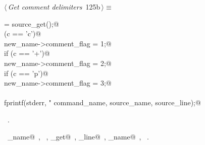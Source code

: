 \documentclass[a4paper]{report}
\begin{document}
\begin{flushleft} \small
\begin{minipage}{\linewidth}\label{scrap265}\raggedright\small
{} $\langle\,${\it Get comment delimiters}\nobreak\ {\footnotesize {125b}}$\,\rangle\equiv$
\vspace{-1ex}
\begin{list}{}{} \item
\mbox{}\verb@c = source_get();@\\
\mbox{}\verb@if (c == 'c')@\\
\mbox{}\verb@   new_name->comment_flag = 1;@\\
\mbox{}\verb@else if (c == '+')@\\
\mbox{}\verb@   new_name->comment_flag = 2;@\\
\mbox{}\verb@else if (c == 'p')@\\
\mbox{}\verb@   new_name->comment_flag = 3;@\\
\mbox{}\verb@else@\\
\mbox{}\verb@   fprintf(stderr, "%s: Unrecognised comment flag (%s, %d)\n",@\\
\mbox{}\verb@           command_name, source_name, source_line);@\\
\mbox{}\verb@@{\NWsep}
\end{list}
\vspace{-1.5ex}
\footnotesize
\begin{list}{}{\setlength{\itemsep}{-\parsep}\setlength{\itemindent}{-\leftmargin}}
\item \NWtxtMacroRefIn\ .
\item \NWtxtIdentsUsed\nobreak\  \verb@command_name@\nobreak\ , \verb@fprintf@\nobreak\ , \verb@source_get@\nobreak\ , \verb@source_line@\nobreak\ , \verb@source_name@\nobreak\ , \verb@stderr@\nobreak\ .
\item{}
\end{list}
\end{minipage}\vspace{4ex}
\end{flushleft}
\end{document}
